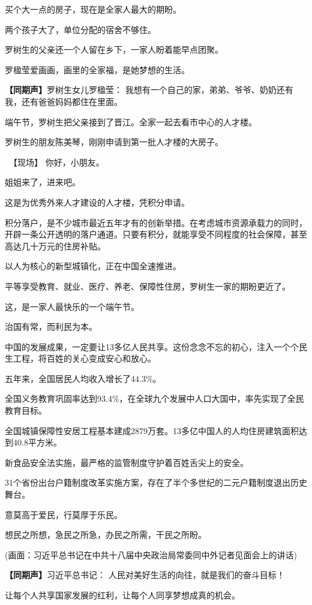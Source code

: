 \documentclass{ctexart}
\newcommand{\zkh}[1]{\textbf{\hspace{-2.7em} 【#1】}}
\begin{document}
 买个大一点的房子，现在是全家人最大的期盼。

 两个孩子大了，单位分配的宿舍不够住。

 罗树生的父亲还一个人留在乡下，一家人盼着能早点团聚。

 罗楹莹爱画画，画里的全家福，是她梦想的生活。

 \zkh{同期声}罗树生女儿罗楹莹： 我想有一个自己的家，弟弟、爷爷、奶奶还有我，还有爸爸妈妈都住在里面。

 端午节，罗树生把父亲接到了晋江。全家一起去看市中心的人才楼。

 罗树生的朋友陈美琴，刚刚申请到第一批人才楼的大房子。

 　【现场】 你好，小朋友。

 姐姐来了，进来吧。

 这是为优秀外来人才建设的人才楼，凭积分申请。

积分落户，是不少城市最近五年才有的创新举措。在考虑城市资源承载力的同时，开辟一条公开透明的落户通道。只要有积分，就能享受不同程度的社会保障，甚至高达几十万元的住房补贴。

 以人为核心的新型城镇化，正在中国全速推进。

 平等享受教育、就业、医疗、养老、保障性住房，罗树生一家的期盼更近了。

 这，是一家人最快乐的一个端午节。

 治国有常，而利民为本。

中国的发展成果，一定要让13多亿人民共享。这份念念不忘的初心，注入一个个民生工程，将百姓的关心变成安心和放心。

 五年来，全国居民人均收入增长了44.3{\%}。

全国义务教育巩固率达到93.4{\%}，在全球九个发展中人口大国中，率先实现了全民教育目标。

全国城镇保障性安居工程基本建成2879万套。13多亿中国人的人均住房建筑面积达到40.8平方米。

 新食品安全法实施，最严格的监管制度守护着百姓舌尖上的安全。

31个省份出台户籍制度改革实施方案，存在了半个多世纪的二元户籍制度退出历史舞台。

 意莫高于爱民，行莫厚于乐民。

 想民之所想，急民之所急，办民之所需，干民之所盼。

 (画面：习近平总书记在中共十八届中央政治局常委同中外记者见面会上的讲话)

 \zkh{同期声}习近平总书记： 人民对美好生活的向往，就是我们的奋斗目标！

 让每个人共享国家发展的红利，让每个人同享梦想成真的机会。
\end{document}

